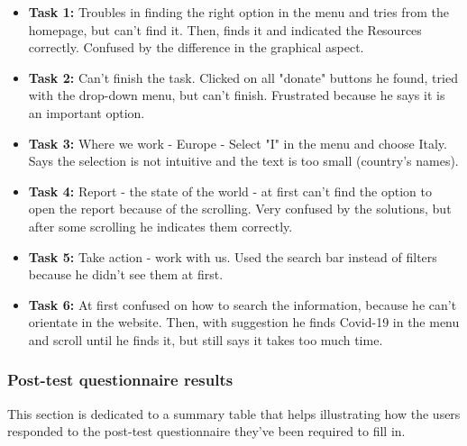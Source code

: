 \begin{itemize}
	\item \textbf{Task 1:} Troubles in finding the right option in the menu and tries from the homepage, but can't find it. Then, finds it and indicated the Resources correctly. Confused by the difference in the graphical aspect.
	\item \textbf{Task 2:} Can't finish the task. Clicked on all "donate" buttons he found, tried with the drop-down menu, but can't finish. Frustrated because he says it is an important option.
	\item \textbf{Task 3:} Where we work - Europe - Select "I" in the menu and choose Italy. Says the selection is not intuitive and the text is too small (country's names).
	\item \textbf{Task 4:} Report - the state of the world - at first can't find the option to open the report because of the scrolling. Very confused by the solutions, but after some scrolling he indicates them correctly.
	\item \textbf{Task 5:} Take action - work with us. Used the search bar instead of filters because he didn't see them at first.
	\item \textbf{Task 6:} At first confused on how to search the information, because he can't orientate in the website. Then, with suggestion he finds Covid-19 in the menu and scroll until he finds it, but still says it takes too much time.
\end{itemize}

\clearpage




\subsubsection*{Post-test questionnaire results}
This section is dedicated to a summary table that helps illustrating how the users responded to the post-test questionnaire they've been required to fill in.\\

